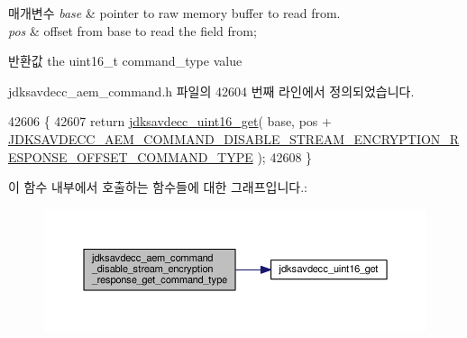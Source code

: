 \begin{DoxyParams}{매개변수}
{\em base} & pointer to raw memory buffer to read from. \\
\hline
{\em pos} & offset from base to read the field from; \\
\hline
\end{DoxyParams}
\begin{DoxyReturn}{반환값}
the uint16\+\_\+t command\+\_\+type value 
\end{DoxyReturn}


jdksavdecc\+\_\+aem\+\_\+command.\+h 파일의 42604 번째 라인에서 정의되었습니다.


\begin{DoxyCode}
42606 \{
42607     \textcolor{keywordflow}{return} \hyperlink{group__endian_ga3fbbbc20be954aa61e039872965b0dc9}{jdksavdecc\_uint16\_get}( base, pos + 
      \hyperlink{group__command__disable__stream__encryption__response_gace766c7fc9d857ba75e46b717f04f59b}{JDKSAVDECC\_AEM\_COMMAND\_DISABLE\_STREAM\_ENCRYPTION\_RESPONSE\_OFFSET\_COMMAND\_TYPE}
       );
42608 \}
\end{DoxyCode}


이 함수 내부에서 호출하는 함수들에 대한 그래프입니다.\+:
\nopagebreak
\begin{figure}[H]
\begin{center}
\leavevmode
\includegraphics[width=350pt]{group__command__disable__stream__encryption__response_gaa0973fda7a4d8e7d5e9551a5a5ba346a_cgraph}
\end{center}
\end{figure}


